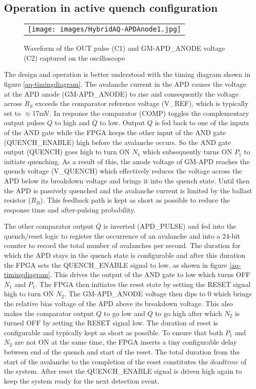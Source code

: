 \subsection{Operation in active quench configuration}
\begin{figure} [ht]
\begin{center}
\begin{tabular}{c} 
\texttt{[image: images/HybridAQ-APDAnode1.jpg]}
\end{tabular}
\end{center}
\caption[] 
{ \label{fig:aq-anode} 
Waveform of the OUT pulse (C1) and GM-APD\_ANODE voltage (C2) captured on the oscilloscope}
\end{figure}
The design and operation is better understood with the timing diagram shown in figure \ref{aq-timingdiagram}. The avalanche current in the APD causes the voltage at the APD anode (GM-APD\_ANODE) to rise and consequently the voltage across $R_S$ exceeds the comparator reference voltage (V\_REF), which is typically set to $\approx$17mV. In response the comparator (COMP) toggles the complementary output pulses $Q$ to high and $\overline{Q}$ to low. Output $Q$ is fed back to one of the inputs of the AND gate while the FPGA keeps the other input of the AND gate (QUENCH\_ENABLE) high before the avalanche occurs. So the AND gate output (QUENCH) goes high to turn ON $N_1$ which subsequently turns ON $P_1$ to initiate quenching. As a result of this, the anode voltage of GM-APD reaches the quench voltage (V\_QUENCH) which effectively reduces the voltage across the APD below its breakdown voltage and brings it into the quench state. Until then the APD is passively quenched and the avalanche current is limited by the ballast resistor ($R_B$). This feedback path is kept as short as possible to reduce the response time and after-pulsing probability\cite{Wayne-AP}.

The other comparator output $\overline{Q}$ is inverted (APD\_PULSE) and fed into the quench/reset logic to register the occurrence of an avalanche and into a 24-bit counter to record the total number of avalanches per second. The duration for which the APD stays in the quench state is configurable and after this duration the FPGA sets the QUENCH\_ENABLE signal to low, as shown in figure \ref{aq-timingdiagram}. This drives the output of the AND gate to low which turns OFF $N_1$ and $P_1$. The FPGA then initiates the reset state by setting the RESET signal high to turn ON $N_2$. The GM-APD\_ANODE voltage then dips to 0 which brings the relative bias voltage of the APD above its breakdown voltage. This also makes the comparator output $Q$ to go low and $\overline{Q}$ to go high after which $N_2$ is turned OFF by setting the RESET signal low. The duration of reset is configurable and typically kept as short as possible. To ensure that both $P_1$ and $N_2$ are not ON at the same time, the FPGA inserts a tiny configurable delay between end of the quench and start of the reset. The total duration from the start of the avalanche to the completion of the reset constitutes the $deadtime$ of the system. After reset the QUENCH\_ENABLE signal is driven high again to keep the system ready for the next detection event.

